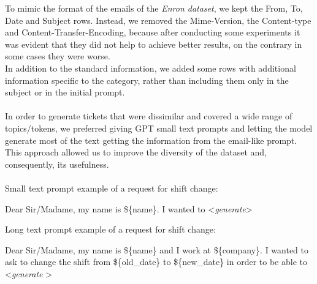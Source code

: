 To mimic the format of the emails of the \textit{Enron dataset}, we kept the From, To, Date and Subject rows. Instead, we removed the Mime-Version, the Content-type and Content-Transfer-Encoding, because after conducting some experiments it was evident that they did not help to achieve better results, on the contrary in some cases they were worse. \\
In addition to the standard information, we added some rows with additional information specific to the category, rather than including them only in the subject or in the initial prompt. \\
\\
In order to generate tickets that were dissimilar and covered a wide range of topics/tokens, we preferred giving GPT small text prompts and letting the model generate most of the text getting the information from the email-like prompt. This approach allowed us to improve the diversity of the dataset and, consequently, its usefulness. \\
\\
Small text prompt example of a request for shift change:
\begin{adjustwidth}{1cm}{}
    Dear Sir/Madame, my name is \$\{name\}. I wanted to \textless \textit{generate}\textgreater
\end{adjustwidth}
Long text prompt example of a request for shift change:
\begin{adjustwidth}{1cm}{}
    Dear Sir/Madame, my name is \$\{name\} and I work at \$\{company\}. I wanted to ask to change the shift from \$\{old\_date\} to \$\{new\_date\} in order to be able to \textless \textit{generate} \textgreater
\end{adjustwidth}